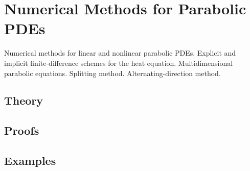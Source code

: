 
\section{Numerical Methods for Parabolic PDEs}
\label{sec:2.1.14-fd-parabolic}

\begin{ticket}
Numerical methods for linear and nonlinear parabolic PDEs. Explicit and implicit finite-difference schemes for the heat equation. Multidimensional parabolic equations. Splitting method. Alternating-direction method.
\end{ticket}

\subsection*{Theory}

\subsection*{Proofs}

\subsection*{Examples}
